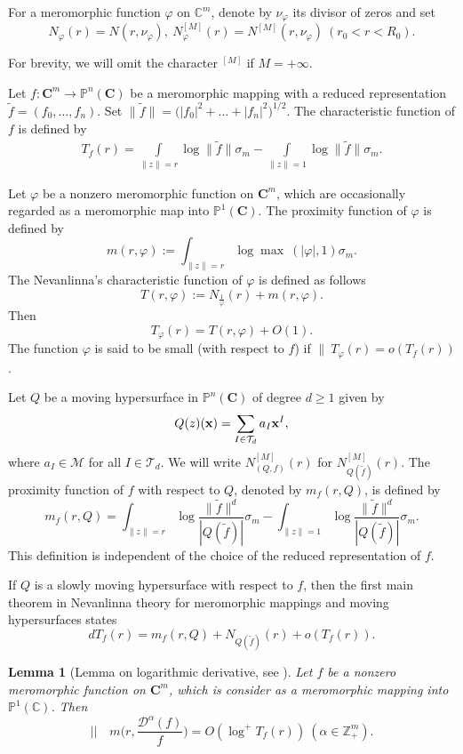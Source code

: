 \documentclass[12pt,leqno]{amsart}
\newtheorem{lemma}[equation]{Lemma}
\newcommand{\C}{{\mathbb{C}}}
\renewcommand{\P}{{\mathbb{P}}}
\newcommand{\Z}{\mathbb{Z}}
\numberwithin{equation}{section}
\begin{document}
For a meromorphic function $\varphi$ on $\C^m$, denote by $\nu_\varphi$ its divisor of zeros and set
$$N_{\varphi}(r)=N(r,\nu_{\varphi}), \ N_{\varphi}^{[M]}(r)=N^{[M]}(r,\nu_{\varphi})\ (r_0<r<R_0).$$

For brevity, we will omit the character $^{[M]}$ if $M=+\infty$.

Let $f : \mathbf{C}^m \longrightarrow \P^n(\mathbf{C})$ be a meromorphic mapping with a reduced representation
$\tilde f= (f_0,  \ldots , f_n)$. Set $\|\tilde f\| = \big(|f_0|^2 + \dots + |f_n|^2\big)^{1/2}$.
The characteristic function of $f$ is defined by 
\begin{align*}
T_f(r)= \int\limits_{\|z\|=r} \log\|\tilde f\| \sigma_m -\int\limits_{\|z\|=1}\log\|\tilde f\|\sigma_m.
\end{align*}

Let $\varphi$ be a nonzero meromorphic function on $\mathbf{C}^m$, which are occasionally regarded as a meromorphic map into $\P^1(\mathbf{C})$. The proximity function of $\varphi$ is defined by
$$m(r,\varphi):=\int_{\|z\|=r}\log \max\ (|\varphi|,1)\sigma_m.$$
The Nevanlinna's characteristic function of $\varphi$ is defined as follows
$$ T(r,\varphi):=N_{\frac{1}{\varphi}}(r)+m(r,\varphi). $$
Then 
$$T_\varphi (r)=T(r,\varphi)+O(1).$$
The function $\varphi$ is said to be small (with respect to $f$) if $\|\ T_\varphi (r)=o(T_f(r))$.

Let $Q$ be a moving hypersurface in $\P^n(\mathbf{C})$ of degree $d\ge 1$ given by
$$ Q(z)({\bf x})=\sum_{I\in\mathcal T_d}a_I{\bf x}^I, $$
where $a_I\in\mathcal M$ for all $I\in\mathcal T_d$. We will write $N^{[M]}_{(Q,f)}(r)$ for $N^{[M]}_{Q(\tilde f)}(r)$.
The proximity function of $f$ with respect to $Q$, denoted by $m_f (r,Q)$, is defined by
$$m_f (r,Q)=\int_{\|z\|=r}\log\dfrac{\|\tilde f\| ^d}{|Q(\tilde f)|}\sigma_m-\int_{\|z\|=1}\log\dfrac{\|\tilde f\| ^d}{|Q(\tilde f)|}\sigma_m.$$
This definition is independent of the choice of the reduced representation of $f$. 

If $Q$ is a slowly moving hypersurface with respect to $f$, then  the first main theorem in Nevanlinna theory for meromorphic mappings and moving hypersurfaces states
$$dT_f (r)=m_f (r,Q) + N_{Q(\tilde f)}(r)+o(T_f(r)).$$

\begin{lemma}[{Lemma on logarithmic derivative, see \cite{NO}}]\label{2.1}
Let $f$ be a nonzero meromorphic function on $\mathbf{C}^m$, which is consider as a meromorphic mapping into $\P^1(\C)$. Then 
$$\biggl|\biggl|\quad m\biggl(r,\dfrac{\mathcal{D}^\alpha (f)}{f}\biggl)=O(\log^+T_f(r))\ (\alpha\in \Z^m_+).$$
\end{lemma}
\end{document}
